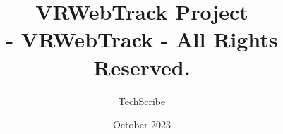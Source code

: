 \documentclass{book}
\begin{document}
\author{TechScribe}
\title{VRWebTrack Project\\
   	   \large \textbf{ - VRWebTrack - All Rights Reserved. }}
\date{October 2023}

\frontmatter

\maketitle
\newpage

\tableofcontents

\mainmatter
%

\backmatter
\end{document}
